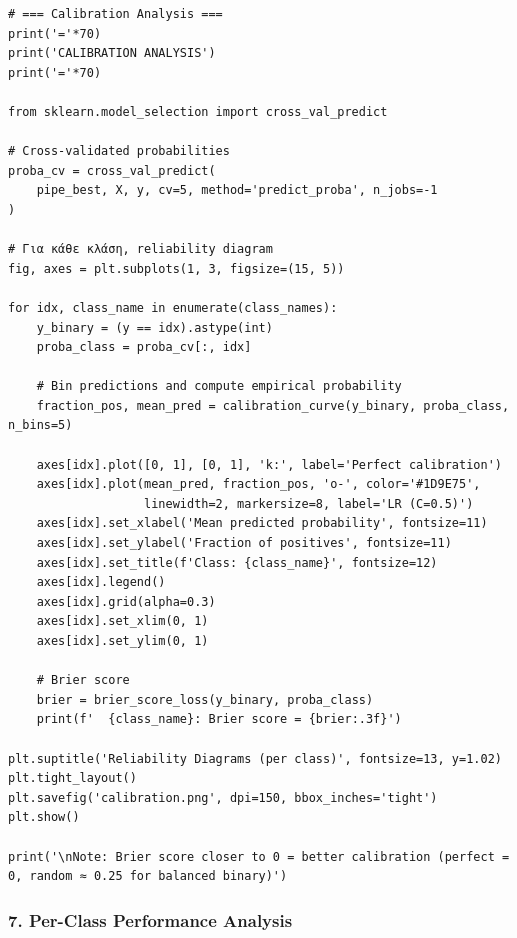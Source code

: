 \begin{lstlisting}
# === Calibration Analysis ===
print('='*70)
print('CALIBRATION ANALYSIS')
print('='*70)
 
from sklearn.model_selection import cross_val_predict
 
# Cross-validated probabilities
proba_cv = cross_val_predict(
    pipe_best, X, y, cv=5, method='predict_proba', n_jobs=-1
)
 
# Για κάθε κλάση, reliability diagram
fig, axes = plt.subplots(1, 3, figsize=(15, 5))
 
for idx, class_name in enumerate(class_names):
    y_binary = (y == idx).astype(int)
    proba_class = proba_cv[:, idx]
 
    # Bin predictions and compute empirical probability
    fraction_pos, mean_pred = calibration_curve(y_binary, proba_class, n_bins=5)
 
    axes[idx].plot([0, 1], [0, 1], 'k:', label='Perfect calibration')
    axes[idx].plot(mean_pred, fraction_pos, 'o-', color='#1D9E75',
                   linewidth=2, markersize=8, label='LR (C=0.5)')
    axes[idx].set_xlabel('Mean predicted probability', fontsize=11)
    axes[idx].set_ylabel('Fraction of positives', fontsize=11)
    axes[idx].set_title(f'Class: {class_name}', fontsize=12)
    axes[idx].legend()
    axes[idx].grid(alpha=0.3)
    axes[idx].set_xlim(0, 1)
    axes[idx].set_ylim(0, 1)
 
    # Brier score
    brier = brier_score_loss(y_binary, proba_class)
    print(f'  {class_name}: Brier score = {brier:.3f}')
 
plt.suptitle('Reliability Diagrams (per class)', fontsize=13, y=1.02)
plt.tight_layout()
plt.savefig('calibration.png', dpi=150, bbox_inches='tight')
plt.show()
 
print('\nNote: Brier score closer to 0 = better calibration (perfect = 0, random ≈ 0.25 for balanced binary)')
\end{lstlisting}
 
\subsubsection*{7. Per-Class Performance Analysis}
 
